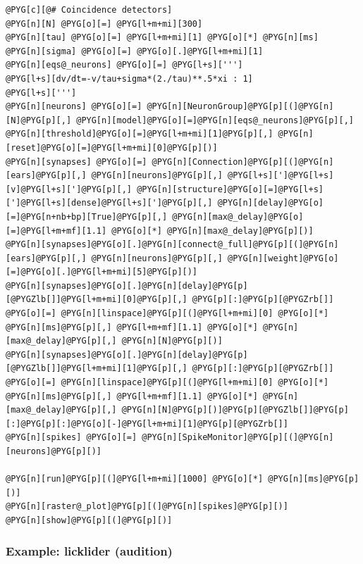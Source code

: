 \documentclass[letterpaper,10pt,english]{manual}
\begin{document}
\begin{Verbatim}[commandchars=@\[\]]
@PYG[c][@# Coincidence detectors]
@PYG[n][N] @PYG[o][=] @PYG[l+m+mi][300]
@PYG[n][tau] @PYG[o][=] @PYG[l+m+mi][1] @PYG[o][*] @PYG[n][ms]
@PYG[n][sigma] @PYG[o][=] @PYG[o][.]@PYG[l+m+mi][1]
@PYG[n][eqs@_neurons] @PYG[o][=] @PYG[l+s][''']
@PYG[l+s][dv/dt=-v/tau+sigma*(2./tau)**.5*xi : 1]
@PYG[l+s][''']
@PYG[n][neurons] @PYG[o][=] @PYG[n][NeuronGroup]@PYG[p][(]@PYG[n][N]@PYG[p][,] @PYG[n][model]@PYG[o][=]@PYG[n][eqs@_neurons]@PYG[p][,] @PYG[n][threshold]@PYG[o][=]@PYG[l+m+mi][1]@PYG[p][,] @PYG[n][reset]@PYG[o][=]@PYG[l+m+mi][0]@PYG[p][)]
@PYG[n][synapses] @PYG[o][=] @PYG[n][Connection]@PYG[p][(]@PYG[n][ears]@PYG[p][,] @PYG[n][neurons]@PYG[p][,] @PYG[l+s][']@PYG[l+s][v]@PYG[l+s][']@PYG[p][,] @PYG[n][structure]@PYG[o][=]@PYG[l+s][']@PYG[l+s][dense]@PYG[l+s][']@PYG[p][,] @PYG[n][delay]@PYG[o][=]@PYG[n+nb+bp][True]@PYG[p][,] @PYG[n][max@_delay]@PYG[o][=]@PYG[l+m+mf][1.1] @PYG[o][*] @PYG[n][max@_delay]@PYG[p][)]
@PYG[n][synapses]@PYG[o][.]@PYG[n][connect@_full]@PYG[p][(]@PYG[n][ears]@PYG[p][,] @PYG[n][neurons]@PYG[p][,] @PYG[n][weight]@PYG[o][=]@PYG[o][.]@PYG[l+m+mi][5]@PYG[p][)]
@PYG[n][synapses]@PYG[o][.]@PYG[n][delay]@PYG[p][@PYGZlb[]]@PYG[l+m+mi][0]@PYG[p][,] @PYG[p][:]@PYG[p][@PYGZrb[]] @PYG[o][=] @PYG[n][linspace]@PYG[p][(]@PYG[l+m+mi][0] @PYG[o][*] @PYG[n][ms]@PYG[p][,] @PYG[l+m+mf][1.1] @PYG[o][*] @PYG[n][max@_delay]@PYG[p][,] @PYG[n][N]@PYG[p][)]
@PYG[n][synapses]@PYG[o][.]@PYG[n][delay]@PYG[p][@PYGZlb[]]@PYG[l+m+mi][1]@PYG[p][,] @PYG[p][:]@PYG[p][@PYGZrb[]] @PYG[o][=] @PYG[n][linspace]@PYG[p][(]@PYG[l+m+mi][0] @PYG[o][*] @PYG[n][ms]@PYG[p][,] @PYG[l+m+mf][1.1] @PYG[o][*] @PYG[n][max@_delay]@PYG[p][,] @PYG[n][N]@PYG[p][)]@PYG[p][@PYGZlb[]]@PYG[p][:]@PYG[p][:]@PYG[o][-]@PYG[l+m+mi][1]@PYG[p][@PYGZrb[]]
@PYG[n][spikes] @PYG[o][=] @PYG[n][SpikeMonitor]@PYG[p][(]@PYG[n][neurons]@PYG[p][)]

@PYG[n][run]@PYG[p][(]@PYG[l+m+mi][1000] @PYG[o][*] @PYG[n][ms]@PYG[p][)]
@PYG[n][raster@_plot]@PYG[p][(]@PYG[n][spikes]@PYG[p][)]
@PYG[n][show]@PYG[p][(]@PYG[p][)]
\end{Verbatim}

\resetcurrentobjects
\hypertarget{--doc-examples-audition_licklider}{}

\hypertarget{index-21}{}\subsubsection{Example: licklider (audition)}
\end{document}
